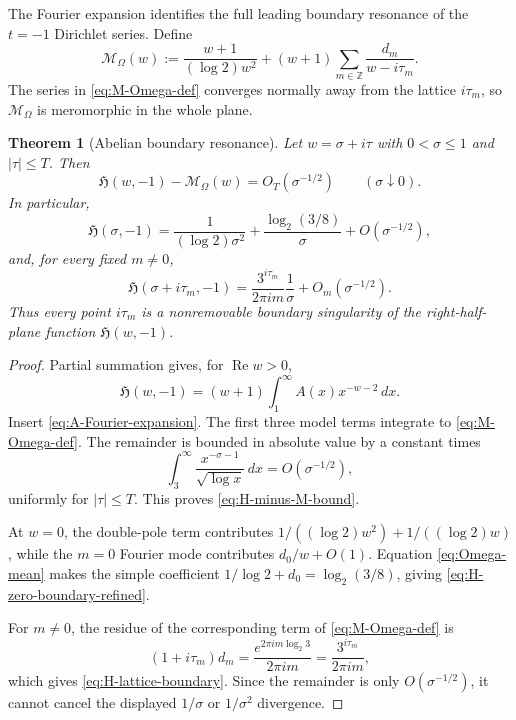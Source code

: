 \documentclass[11pt]{article}
\newtheorem{theorem}{Theorem}[section]
\theoremstyle{definition}
\theoremstyle{remark}
\newcommand{\RePart}{\operatorname{Re}}
\newcommand{\Hz}{\mathfrak H}
\begin{document}
The Fourier expansion identifies the full leading boundary resonance of the
$t=-1$ Dirichlet series.  Define
\begin{equation}
\mathcal M_{\Omega}(w)
:=\frac{w+1}{(\log2)w^2}
+(w+1)\sum_{m\in\mathbb Z}\frac{d_m}{w-i\tau_m}.
\label{eq:M-Omega-def}
\end{equation}
The series in \eqref{eq:M-Omega-def} converges normally away from the lattice
$i\tau_m$, so $\mathcal M_{\Omega}$ is meromorphic in the whole plane.

\begin{theorem}[Abelian boundary resonance]
\label{thm:Abelian-boundary-resonance}
Let $w=\sigma+i\tau$ with $0<\sigma\le1$ and $|\tau|\le T$.  Then
\begin{equation}
{
\Hz(w,-1)-\mathcal M_{\Omega}(w)
=O_T(\sigma^{-1/2})
\qquad(\sigma\downarrow0).
}
\label{eq:H-minus-M-bound}
\end{equation}
In particular,
\begin{equation}
{
\Hz(\sigma,-1)
=\frac{1}{(\log2)\sigma^2}
+\frac{\log_2(3/8)}{\sigma}
+O(\sigma^{-1/2}),
}
\label{eq:H-zero-boundary-refined}
\end{equation}
and, for every fixed $m\ne0$,
\begin{equation}
{
\Hz(\sigma+i\tau_m,-1)
=\frac{3^{i\tau_m}}{2\pi i m}\frac1\sigma
+O_m(\sigma^{-1/2}).
}
\label{eq:H-lattice-boundary}
\end{equation}
Thus every point $i\tau_m$ is a nonremovable boundary singularity of the
right-half-plane function $\Hz(w,-1)$.
\end{theorem}

\begin{proof}
Partial summation gives, for $\RePart w>0$,
\[
\Hz(w,-1)
=(w+1)\int_1^\infty A(x)x^{-w-2}\,dx.
\]
Insert \eqref{eq:A-Fourier-expansion}.  The first three model terms integrate
to \eqref{eq:M-Omega-def}.  The remainder is bounded in absolute value by a
constant times
\[
\int_3^\infty
\frac{x^{-\sigma-1}}{\sqrt{\log x}}\,dx
=O(\sigma^{-1/2}),
\]
uniformly for $|\tau|\le T$.  This proves \eqref{eq:H-minus-M-bound}.

At $w=0$, the double-pole term contributes
$1/((\log2)w^2)+1/((\log2)w)$, while the $m=0$ Fourier mode contributes
$d_0/w+O(1)$.  Equation \eqref{eq:Omega-mean} makes the simple coefficient
$1/\log2+d_0=\log_2(3/8)$, giving
\eqref{eq:H-zero-boundary-refined}.

For $m\ne0$, the residue of the corresponding term of
\eqref{eq:M-Omega-def} is
\[
(1+i\tau_m)d_m
=\frac{e^{2\pi i m\log_2 3}}{2\pi i m}
=\frac{3^{i\tau_m}}{2\pi i m},
\]
which gives \eqref{eq:H-lattice-boundary}.  Since the remainder is only
$O(\sigma^{-1/2})$, it cannot cancel the displayed $1/\sigma$ or
$1/\sigma^2$ divergence.
\end{proof}
\end{document}
